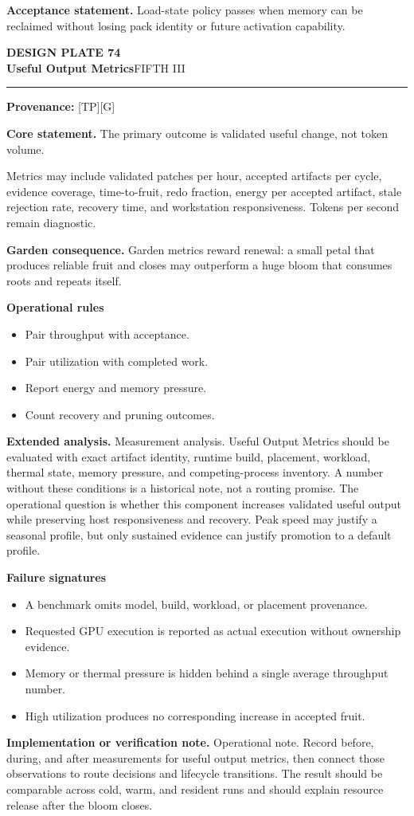 \documentclass[10pt,letterpaper,oneside]{article}
\newcommand{\prov}[1]{\textcolor{gardenBlue}{\sffamily\footnotesize\textbf{Provenance:} #1}}
\newcommand{\platetitle}[3]{%
  \begin{minipage}[t][0.54in][t]{\textwidth}
  {\sffamily\bfseries\color{gardenDeep}\fontsize{9}{10}\selectfont DESIGN PLATE #1}\\[-1pt]
  {\sffamily\bfseries\color{gardenInk}\fontsize{16.5}{18}\selectfont #2}\hfill{\sffamily\color{gardenGreen}\large #3}
  \end{minipage}\vspace{-2pt}\hrule\vspace{5pt}}
\begin{document}
\begin{acceptbox}
\textbf{Acceptance statement.} Load-state policy passes when memory can be reclaimed without losing pack identity or future activation capability.
\end{acceptbox}
\newpage
\platetitle{74}{Useful Output Metrics}{FIFTH III}
\prov{[TP][G]}
\fontsize{8.85}{10.45}\selectfont
\begin{corebox}
\textbf{Core statement.} The primary outcome is validated useful change, not token volume.
\end{corebox}
Metrics may include validated patches per hour, accepted artifacts per cycle, evidence coverage, time-to-fruit, redo fraction, energy per accepted artifact, stale rejection rate, recovery time, and workstation responsiveness. Tokens per second remain diagnostic.

\textbf{Garden consequence.} Garden metrics reward renewal: a small petal that produces reliable fruit and closes may outperform a huge bloom that consumes roots and repeats itself.

\textbf{Operational rules}
\begin{itemize}
\item Pair throughput with acceptance.
\item Pair utilization with completed work.
\item Report energy and memory pressure.
\item Count recovery and pruning outcomes.
\end{itemize}
\textbf{Extended analysis.} Measurement analysis. Useful Output Metrics should be evaluated with exact artifact identity, runtime build, placement, workload, thermal state, memory pressure, and competing-process inventory. A number without these conditions is a historical note, not a routing promise. The operational question is whether this component increases validated useful output while preserving host responsiveness and recovery. Peak speed may justify a seasonal profile, but only sustained evidence can justify promotion to a default profile.

\textbf{Failure signatures}
\begin{itemize}
\item A benchmark omits model, build, workload, or placement provenance.
\item Requested GPU execution is reported as actual execution without ownership evidence.
\item Memory or thermal pressure is hidden behind a single average throughput number.
\item High utilization produces no corresponding increase in accepted fruit.
\end{itemize}
\textbf{Implementation or verification note.} Operational note. Record before, during, and after measurements for useful output metrics, then connect those observations to route decisions and lifecycle transitions. The result should be comparable across cold, warm, and resident runs and should explain resource release after the bloom closes.
\end{document}
